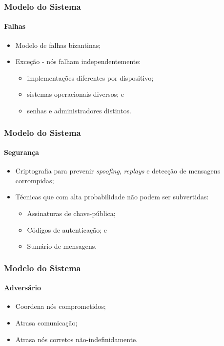\documentclass{beamer}
\begin{document}
\begin{frame}
  \frametitle{Modelo do Sistema}
  \framesubtitle{Falhas}

  \begin{itemize}
    \item
      Modelo de falhas bizantinas;
      
    \item
      Exceção - nós falham independentemente:
      \begin{itemize}
        \item
          implementações diferentes por dispositivo;

        \item
          sistemas operacionais diversos; e

        \item
          senhas e administradores distintos.
      \end{itemize}
  \end{itemize}
\end{frame}

\begin{frame}
  \frametitle{Modelo do Sistema}
  \framesubtitle{Segurança}

  \begin{itemize}
    \item
      Criptografia para prevenir \textit{spoofing}, \textit{replays} e detecção de mensagens corrompidas;

    \item
      Técnicas que com alta probabilidade não podem ser subvertidas:
      \begin{itemize}
        \item
          Assinaturas de chave-pública;
          
        \item
          Códigos de autenticação; e
          
        \item
          Sumário de mensagens.
      \end{itemize}
  \end{itemize}
\end{frame}

\begin{frame}
  \frametitle{Modelo do Sistema}
  \framesubtitle{Adversário}

  \begin{itemize}
      \item
        Coordena nós comprometidos;

      \item
        Atrasa comunicação;

      \item
        Atrasa nós corretos não-indefinidamente.
  \end{itemize}
\end{frame}
\end{document}
